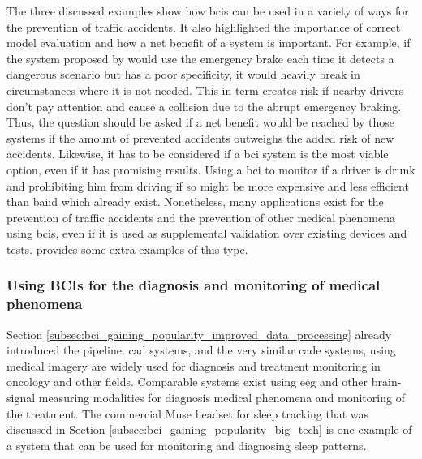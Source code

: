 The three discussed examples show how \glspl{bci} can be used in a variety of ways for the prevention of traffic accidents.
It also highlighted the importance of correct model evaluation and how a net benefit of a system is important.
For example, if the system proposed by \citet{eeg_dangerous_situation_car} would use the emergency brake each time it detects a dangerous scenario but has a poor specificity, it would heavily break in circumstances where it is not needed.
This in term creates risk if nearby drivers don't pay attention and cause a collision due to the abrupt emergency braking.
Thus, the question should be asked if a net benefit would be reached by those systems if the amount of prevented accidents outweighs the added risk of new accidents.
Likewise, it has to be considered if a \gls{bci} system is the most viable option, even if it has promising results.
Using a \gls{bci} to monitor if a driver is drunk and prohibiting him from driving if so might be more expensive and less efficient than \gls{baiid} which already exist.
Nonetheless, many applications exist for the prevention of traffic accidents and the prevention of other medical phenomena using \glspl{bci}, even if it is used as supplemental validation over existing devices and tests.
\citet{bci_applications} provides some extra examples of this type.


\subsubsection{Using BCIs for the diagnosis and monitoring of medical phenomena}
\label{subsubsec:bci_common_use_cases_medical_phenomena_monitoring}

Section \ref{subsec:bci_gaining_popularity_improved_data_processing} already introduced the  pipeline.
\gls{cad} systems, and the very similar \gls{cade} systems, using medical imagery are widely used for diagnosis and treatment monitoring in oncology and other fields.
Comparable systems exist using \gls{eeg} and other brain-signal measuring modalities for diagnosis medical phenomena and monitoring of the treatment.
The commercial Muse headset for sleep tracking that was discussed in Section \ref{subsec:bci_gaining_popularity_big_tech} is one example of a system that can be used for monitoring and diagnosing sleep patterns.

